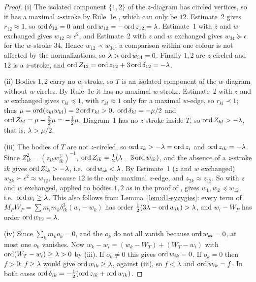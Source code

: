 \begin{proof}
(i) The isolated component $\{1,2\}$ of the $z$-diagram has circled vertices, so it has a
maximal $z$-stroke by Rule~1e \cite[p.~546]{AK}, which can only be $12$.  Estimate~2
\cite[p.~548]{AK} gives $r_{12}\approx1$, so $\operatorname{ord}\delta_{12}=0$ and $\operatorname{ord} w_{12}=-\operatorname{ord}
z_{12}=\lambda$.  Estimate~1 \cite[p.~548]{AK} with $z$ and $w$ exchanged gives
$w_{12}\approx\epsilon^2$, and Estimate~2 with $z$ and $w$ exchanged gives $w_{34}\succcurlyeq\epsilon$
for the $w$-stroke $34$.  Hence $w_{12}\prec w_{34}$; a comparison within one colour is not
affected by the normalizations, so $\lambda>\operatorname{ord} w_{34}=0$.  Finally $1,2$ are $z$-circled and
$12$ is a $z$-stroke, and $\operatorname{ord} Z_{12}=\operatorname{ord} z_{12}+3\operatorname{ord}\delta_{12}=-\lambda$.

(ii) Bodies $1,2$ carry no $w$-stroke, so $T$ is an isolated component of the $w$-diagram
without $w$-circles.  By Rule~1e it has no maximal $w$-stroke.  Estimate~2 with $z$ and $w$
exchanged gives $r_{kl}\preccurlyeq1$, with $r_{kl}\approx1$ only for a maximal $w$-edge, so
$r_{kl}\prec1$; thus $\mu=\operatorname{ord}(z_{kl}w_{kl})=2\operatorname{ord} r_{kl}>0$, $\operatorname{ord}\delta_{kl}=
-\mu/2$ and $\operatorname{ord} Z_{kl}=\mu-\frac32\mu=-\frac12\mu$.  Diagram~1 has no $z$-stroke inside $T$, so
$\operatorname{ord} Z_{kl}>-\lambda$, that is, $\lambda>\mu/2$.

(iii) The bodies of $T$ are not $z$-circled, so $\operatorname{ord} z_k>-\lambda=\operatorname{ord} z_i$ and $\operatorname{ord}
z_{ik}=-\lambda$.  Since $Z_{ik}^2=(z_{ik}w_{ik}^3)^{-1}$, $\operatorname{ord} Z_{ik}=\frac12(\lambda-3\operatorname{ord}
w_{ik})$, and the absence of a $z$-stroke $ik$ gives $\operatorname{ord} Z_{ik}>-\lambda$, i.e.\ $\operatorname{ord}
w_{ik}<\lambda$.  By Estimate~1 ($z$ and $w$ exchanged) $w_{2k}\succ\epsilon^2\approx w_{12}$,
because $12$ is the only maximal $z$-edge, and $z_{2k}\approx z_{12}$.  So
\cite[Prop.~1, p.~559]{AK} with $z$ and $w$ exchanged, applied to bodies $1,2$ as in the proof of
\cite[Prop.~4, p.~564]{AK}, gives $w_1,w_2\preccurlyeq w_{12}$, i.e.\ $\operatorname{ord} w_i\ge\lambda$.  This
also follows from Lemma~\ref{lem:d1-syzygies}: every term of $M_PW_P=\sum m_im_k\delta_{ik}^3
(w_i-w_k)$ has order $\frac12(3\lambda-\operatorname{ord} w_{ik})>\lambda$, and $w_i-W_P$ has order
$\operatorname{ord} w_{12}=\lambda$.

(iv) Since $\sum_km_ko_k=0$, and the $o_k$ do not all vanish because $\operatorname{ord} w_{kl}=0$, at most one
$o_k$ vanishes.  Now $w_k-w_i=(w_k-W_T)+(W_T-w_i)$ with $\operatorname{ord}(W_T-w_i)\ge\lambda>0$ by (iii).  If
$o_k\ne0$ this gives $\operatorname{ord} w_{ik}=0$.  If $o_k=0$ then $f>0$; $f\ge\lambda$ would give $\operatorname{ord}
w_{ik}\ge\lambda$, against (iii), so $f<\lambda$ and $\operatorname{ord} w_{ik}=f$.  In both cases
$\operatorname{ord}\delta_{ik}=-\frac12(\operatorname{ord} z_{ik}+\operatorname{ord} w_{ik})$.
\end{proof}

